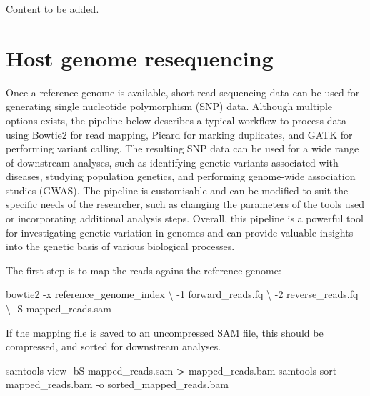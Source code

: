 \documentclass[
]{book}
\newenvironment{Shaded}{\begin{snugshade}}{\end{snugshade}}
\newcommand{\AttributeTok}[1]{\textcolor[rgb]{0.77,0.63,0.00}{#1}}
\newcommand{\DataTypeTok}[1]{\textcolor[rgb]{0.13,0.29,0.53}{#1}}
\newcommand{\ExtensionTok}[1]{#1}
\newcommand{\NormalTok}[1]{#1}
\newcommand{\OperatorTok}[1]{\textcolor[rgb]{0.81,0.36,0.00}{\textbf{#1}}}
\begin{document}
Content to be added.

\hypertarget{host-resequencing}{%
\section{Host genome resequencing}\label{host-resequencing}}

Once a reference genome is available, short-read sequencing data can be used for generating single nucleotide polymorphism (SNP) data. Although multiple options exists, the pipeline below describes a typical workflow to process data using Bowtie2 for read mapping, Picard for marking duplicates, and GATK for performing variant calling. The resulting SNP data can be used for a wide range of downstream analyses, such as identifying genetic variants associated with diseases, studying population genetics, and performing genome-wide association studies (GWAS). The pipeline is customisable and can be modified to suit the specific needs of the researcher, such as changing the parameters of the tools used or incorporating additional analysis steps. Overall, this pipeline is a powerful tool for investigating genetic variation in genomes and can provide valuable insights into the genetic basis of various biological processes.

The first step is to map the reads agains the reference genome:
\small

\begin{Shaded}
\begin{Highlighting}[]
\ExtensionTok{bowtie2} \AttributeTok{{-}x}\NormalTok{ reference\_genome\_index }\DataTypeTok{\textbackslash{}}
    \AttributeTok{{-}1}\NormalTok{ forward\_reads.fq }\DataTypeTok{\textbackslash{}}
    \AttributeTok{{-}2}\NormalTok{ reverse\_reads.fq }\DataTypeTok{\textbackslash{}}
    \AttributeTok{{-}S}\NormalTok{ mapped\_reads.sam}
\end{Highlighting}
\end{Shaded}

\normalsize

If the mapping file is saved to an uncompressed SAM file, this should be compressed, and sorted for downstream analyses.
\small

\begin{Shaded}
\begin{Highlighting}[]
\ExtensionTok{samtools}\NormalTok{ view }\AttributeTok{{-}bS}\NormalTok{ mapped\_reads.sam }\OperatorTok{\textgreater{}}\NormalTok{ mapped\_reads.bam}
\ExtensionTok{samtools}\NormalTok{ sort mapped\_reads.bam }\AttributeTok{{-}o}\NormalTok{ sorted\_mapped\_reads.bam}
\end{Highlighting}
\end{Shaded}
\end{document}

